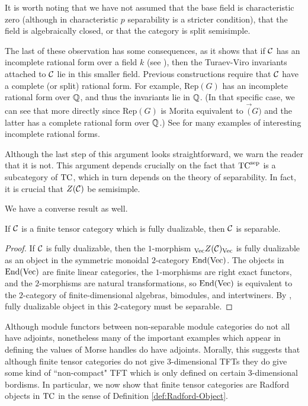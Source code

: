 \documentclass{amsart}
\begin{document}
\begin{remark}
It is worth noting that we have not assumed that the base field is characteristic zero (although in characteristic $p$ separability is a stricter condition), that the field is algebraically closed, or that the category is split semisimple.  

The last of these observation has some consequences, as it shows that if $\mathcal C$ has an incomplete rational form over a field $k$ (see \cite{1002.0168}), then the Turaev-Viro invariants attached to $\mathcal C$ lie in this smaller field.  Previous constructions require that $\mathcal C$ have a complete (or split) rational form.  For example, $\mathrm{Rep}(G)$ has an incomplete rational form over $\mathbb Q$, and thus the invariants lie in $\mathbb Q$.  (In that specific case, we can see that more directly since $\mathrm{Rep}(G)$ is Morita equivalent to $\Vec(G)$ and the latter has a complete rational form over $\mathbb Q$.)  See \cite{1102.0657} for many examples of interesting incomplete rational forms.
\end{remark}

\begin{warning}
Although the last step of this argument looks straightforward, we warn the reader that it is not.  This argument depends crucially on the fact that ${\mathrm{TC}^{\text{sep}}}$ is a subcategory of $\mathrm{TC}$, which in turn depends on the theory of separability.  In fact, it is crucial that $Z(\mathcal C)$ be semisimple.
\end{warning}

We have a converse result as well.

\begin{maintheorem}
If $\mathcal C$ is a finite tensor category which is fully dualizable, then $\mathcal C$ is separable.
\end{maintheorem}
\begin{proof}
If $\mathcal C$ is fully dualizable, then the $1$-morphism ${}_{\mathrm{Vec}} Z(\mathcal C)_{\mathrm{Vec}}$ is fully dualizable as an object in the symmetric monoidal $2$-category $\operatorname{End}(\mathrm{Vec})$.  The objects in $\operatorname{End}(\mathrm{Vec})$ are finite linear categories, the $1$-morphisms are right exact functors, and the $2$-morphisms are natural transformations, so $\operatorname{End}(\mathrm{Vec})$ is equivalent to the $2$-category of finite-dimensional algebras, bimodules, and intertwiners.  By \cite{schommer-pries-thesis},  fully dualizable object in this $2$-category must be separable.
\end{proof}

Although module functors between non-separable module categories do not all have adjoints, nonetheless many of the important examples which appear in defining the values of Morse handles do have adjoints.  Morally, this suggests that although finite tensor categories do not give $3$-dimensional TFTs they do give some kind of ``non-compact" TFT which is only defined on certain $3$-dimensional bordisms.  In particular, we now show that finite tensor categories are Radford objects in $\mathrm{TC}$ in the sense of Definition \ref{def:Radford-Object}.
\end{document}

